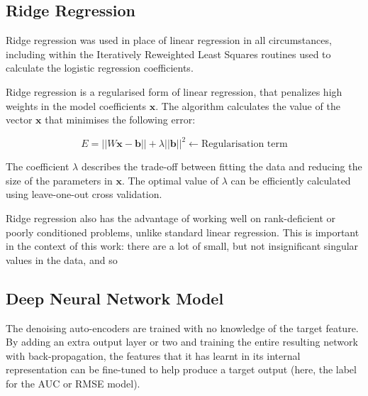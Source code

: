 \documentclass{article}
\begin{document}
\subsection{Ridge Regression}

Ridge regression was used in place of linear regression in all circumstances, including within the Iteratively Reweighted Least Squares routines used to calculate the logistic regression coefficients.

Ridge regression is a regularised form of linear regression, that penalizes high weights in the model coefficients $\mathbf{x}$.  The algorithm calculates the value of the vector $\mathbf{x}$ that minimises the following error:

\begin{equation}
  E = ||W\mathbf{x} - \mathbf{b}|| + \lambda ||\mathbf{b}||^2 \leftarrow \mbox{Regularisation term}
\end{equation}

The coefficient $\lambda$ describes the trade-off between fitting the data and reducing the size of the parameters in $\mathbf{x}$.  The optimal value of $\lambda$ can be efficiently calculated using leave-one-out cross validation.

Ridge regression also has the advantage of working well on rank-deficient or poorly conditioned problems, unlike standard linear regression.  
This is important in the context of this work: there are a lot of small, but not insignificant singular values in the data, and so 

\subsection{Deep Neural Network Model}

The denoising auto-encoders are trained with no knowledge of the target feature.
By adding an extra output layer or two and training the entire resulting network with back-propagation, the features that it has learnt in its internal representation can be fine-tuned to help produce a target output (here, the label for the AUC or RMSE model).
\end{document}
